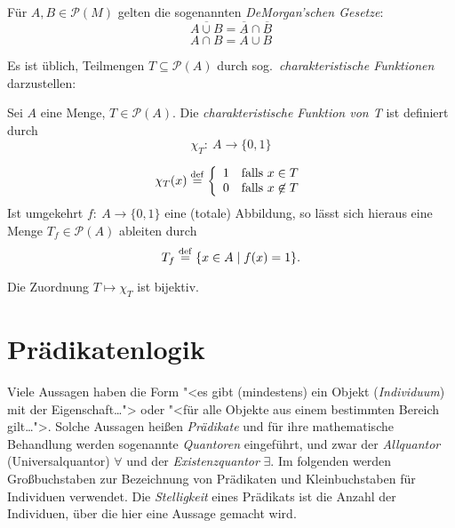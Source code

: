 \begin{lemma}
   Für $A,B \in \mathcal{P}(M)$ gelten die sogenannten \textit{DeMorgan'schen Gesetze}:
   \[ \overline{A \cup B} = \overline{A} \cap \overline{B}\]
   \[ \overline{A \cap B} = \overline{A} \cup \overline{B}\]
\end{lemma}

Es ist üblich,
Teilmengen $T \subseteq \mathcal{P}(A)$ durch sog.\ \emph{charakteristische
Funktionen} dar\-zu\-stel\-len:

\begin{definition}\label{def:charfunction}
 Sei $A$ eine Menge, $T \in \mathcal{P}(A)$. Die \emph{charakteristische
    Funk\-tion von T} ist definiert durch
    \[ \chi_T:\ A \longrightarrow \{0,1\}\]

    \[\chi_T(x) \stackrel{\rm def}{=} \left \{ \begin{array}{ll}
                                1 & \textrm{falls\ } x \in T\\
                                0 & \textrm{falls\ } x \not \in T
                              \end{array}
                     \right . \]
    Ist umgekehrt $f:\ A \rightarrow \{0,1\}$ eine (totale) Abbildung, so lässt
    sich hieraus eine Menge $T_f \in \mathcal{P}(A)$ ableiten durch
    \[ T_f \stackrel{\rm def}{=} \{x \in A \mid f(x) = 1\} .\]
\end{definition}

\noindent Die Zuordnung $T \mapsto \chi_T$ ist bijektiv. 


\section{Prädikatenlogik}
\label{sec:praedikate}

Viele Aussagen haben die Form "<es gibt (mindestens) ein Objekt
(\emph{Individuum}) mit der Eigenschaft\ldots"> oder "<für alle
Objekte aus einem bestimmten Be\-reich gilt\ldots">.  Solche Aussagen heißen
\emph{Prädikate} 
 und für ihre mathematische Behandlung
werden sogenannte \emph{Quantoren} eingeführt, und zwar der \emph{All\-quan\-tor}
(Universalquantor) $\forall$  und der \emph{Existenzquantor}
$\exists$.  Im folgenden werden Großbuchstaben zur Bezeichnung
von Prädikaten und Kleinbuchstaben für Individuen verwendet. Die \emph{Stelligkeit} eines Prädikats ist die Anzahl der Individuen, über die hier
eine Aussage gemacht wird.

